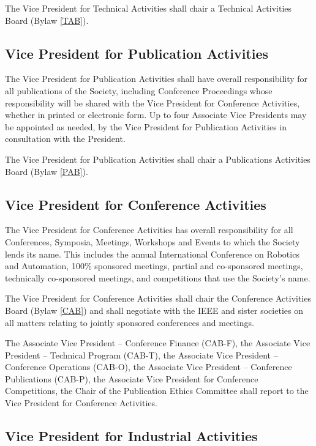 \documentclass[10pt]{article}
\newcommand{\blref}[1]{Bylaw \ref{#1}}
\begin{document}
The Vice President for Technical Activities shall chair a Technical Activities Board (\blref{TAB}). 



\subsection{Vice President for Publication Activities}

The Vice President for Publication Activities shall have overall responsibility for all publications of the Society, including Conference Proceedings whose responsibility will be shared with the Vice President for Conference Activities, whether in printed or electronic form.  Up to four Associate Vice Presidents may be appointed as needed, by the Vice President for Publication Activities in consultation with the President. 

The Vice President for Publication Activities shall chair a Publications Activities Board (\blref{PAB}). 



\subsection{Vice President for Conference Activities}

The Vice President for Conference Activities has overall responsibility for all Conferences, Symposia, Meetings, Workshops and Events to which the Society lends its name. This includes the annual International Conference on Robotics and Automation, 100\% sponsored meetings, partial and co-sponsored meetings, technically co-sponsored meetings, and competitions that use the Society's name. 

The Vice President for Conference Activities shall chair the Conference Activities Board (\blref{CAB}) and shall negotiate with the IEEE and sister societies on all matters relating to jointly sponsored conferences and meetings.  

The Associate Vice President – Conference Finance (CAB-F), the Associate Vice President – Technical Program (CAB-T), the Associate Vice President – Conference Operations (CAB-O), the Associate Vice President – Conference Publications (CAB-P), the Associate Vice President for Conference Competitions, the Chair of the Publication Ethics Committee shall report to the Vice President for Conference Activities.



\subsection{Vice President for Industrial Activities}
\end{document}
